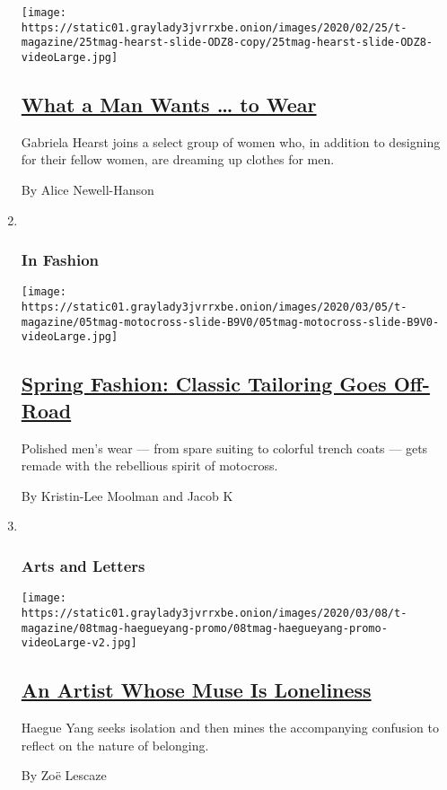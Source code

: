 \begin{enumerate}
  \texttt{[image: https://static01.graylady3jvrrxbe.onion/images/2020/02/25/t-magazine/25tmag-hearst-slide-ODZ8-copy/25tmag-hearst-slide-ODZ8-videoLarge.jpg]}

  \hypertarget{what-a-man-wants--to-wear}{%
  \subsection{\texorpdfstring{\href{/2020/02/25/t-magazine/gabriela-hearst-mens-fashion.html}{What
  a Man Wants \ldots{} to
  Wear}}{What a Man Wants \ldots{} to Wear}}\label{what-a-man-wants--to-wear}}

  Gabriela Hearst joins a select group of women who, in addition to
  designing for their fellow women, are dreaming up clothes for men.

  By Alice Newell-Hanson
\item ~
  \hypertarget{in-fashion-1}{%
  \subsubsection{In Fashion}\label{in-fashion-1}}

  \texttt{[image: https://static01.graylady3jvrrxbe.onion/images/2020/03/05/t-magazine/05tmag-motocross-slide-B9V0/05tmag-motocross-slide-B9V0-videoLarge.jpg]}

  \hypertarget{spring-fashion-classic-tailoring-goes-off-road}{%
  \subsection{\texorpdfstring{\href{/2020/02/27/t-magazine/spring-mens-fashion.html}{Spring
  Fashion: Classic Tailoring Goes
  Off-Road}}{Spring Fashion: Classic Tailoring Goes Off-Road}}\label{spring-fashion-classic-tailoring-goes-off-road}}

  Polished men's wear --- from spare suiting to colorful trench coats
  --- gets remade with the rebellious spirit of motocross.

  By Kristin-Lee Moolman and Jacob K
\item ~
  \hypertarget{arts-and-letters}{%
  \subsubsection{Arts and Letters}\label{arts-and-letters}}

  \texttt{[image: https://static01.graylady3jvrrxbe.onion/images/2020/03/08/t-magazine/08tmag-haegueyang-promo/08tmag-haegueyang-promo-videoLarge-v2.jpg]}

  \hypertarget{an-artist-whose-muse-is-loneliness}{%
  \subsection{\texorpdfstring{\href{/2020/02/26/t-magazine/haegue-yang.html}{An
  Artist Whose Muse Is
  Loneliness}}{An Artist Whose Muse Is Loneliness}}\label{an-artist-whose-muse-is-loneliness}}

  Haegue Yang seeks isolation and then mines the accompanying confusion
  to reflect on the nature of belonging.

  By Zoë Lescaze
\end{enumerate}

